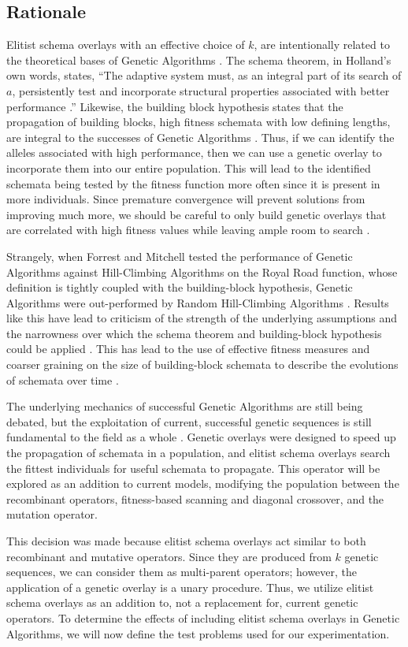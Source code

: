 \subsection*{Rationale}
Elitist schema overlays with an effective choice of $k$, are intentionally related to the theoretical bases of Genetic Algorithms \cite{Goldberg89, Holland75}. The schema theorem, in Holland's own words, states, ``The adaptive system must, as an integral part of its search of $a$, persistently test and incorporate structural properties associated with better performance \cite{Holland75}.'' Likewise, the building block hypothesis states that the propagation of building blocks, high fitness schemata with low defining lengths, are integral to the successes of Genetic Algorithms \cite{Goldberg89}. Thus, if we can identify the alleles associated with high performance, then we can use a genetic overlay to incorporate them into our entire population. This will lead to the identified schemata being tested by the fitness function more often since it is present in more individuals. Since premature convergence will prevent solutions from improving much more, we should be careful to only build genetic overlays that are correlated with high fitness values while leaving ample room to search \cite{Andre01}.

Strangely, when Forrest and Mitchell tested the performance of Genetic Algorithms against Hill-Climbing Algorithms on the Royal Road function, whose definition is tightly coupled with the building-block hypothesis, Genetic Algorithms were out-performed by Random Hill-Climbing Algorithms \cite{Forrest93}. Results like this have lead to criticism of the strength of the underlying assumptions and the narrowness over which the schema theorem and building-block hypothesis could be applied \cite{Burjorjee08, Senaratna05}. This has lead to the use of effective fitness measures and coarser graining on the size of building-block schemata to describe the evolutions of schemata over time \cite{Stephens99}.

The underlying mechanics of successful Genetic Algorithms are still being debated, but the exploitation of current, successful genetic sequences is still fundamental to the field as a whole \cite{Russell10, Senaratna05}. Genetic overlays were designed to speed up the propagation of schemata in a population, and elitist schema overlays search the fittest individuals for useful schemata to propagate. This operator will be explored as an addition to current models, modifying the population between the recombinant operators, fitness-based scanning and diagonal crossover, and the mutation operator. 

This decision was made because elitist schema overlays act similar to both recombinant and mutative operators. Since they are produced from $k$ genetic sequences, we can consider them as multi-parent operators; however, the application of a genetic overlay is a unary procedure. Thus, we utilize elitist schema overlays as an addition to, not a replacement for, current genetic operators. To determine the effects of including elitist schema overlays in Genetic Algorithms, we will now define the test problems used for our experimentation.